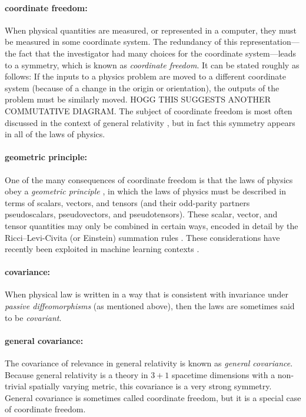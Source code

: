 \documentclass{article}
\begin{document}
\paragraph{coordinate freedom:}
When physical quantities are measured, or represented in a computer, they must be measured in some coordinate system.
The redundancy of this representation---the fact that the investigator had many choices for the coordinate system---leads to a symmetry, which is known as \emph{coordinate freedom}.
It can be stated roughly as follows:
If the inputs to a physics problem are moved to a different coordinate system (because of a change in the origin or orientation), the outputs of the problem must be similarly moved.
HOGG THIS SUGGESTS ANOTHER COMMUTATIVE DIAGRAM.
The subject of coordinate freedom is most often discussed in the context of general relativity \cite{gr}, but in fact this symmetry appears in all of the laws of physics.

\paragraph{geometric principle:}
One of the many consequences of coordinate freedom is that the laws of physics obey a \emph{geometric principle} \cite{mcp}, in which the laws of physics must be described in terms of scalars, vectors, and tensors (and their odd-parity partners pseudoscalars, pseudovectors, and pseudotensors).
These scalar, vector, and tensor quantities may only be combined in certain ways, encoded in detail by the Ricci--Levi-Civita (or Einstein) summation rules \cite{ricci, einsteinsummation}.
These considerations have recently been exploited in machine learning contexts \cite{villar2021scalars}.

\paragraph{covariance:}
When physical law is written in a way that is consistent with invariance under \emph{passive diffeomorphisms} (as mentioned above), then the laws are sometimes said to be \emph{covariant}.

\paragraph{general covariance:}
The covariance of relevance in general relativity \cite{einstein} is known as \emph{general covariance}.
Because general relativity is a theory in $3+1$ spacetime dimensions with a non-trivial spatially varying metric, this covariance is a very strong symmetry.
General covariance is sometimes called coordinate freedom, but it is a special case of coordinate freedom.
\end{document}
